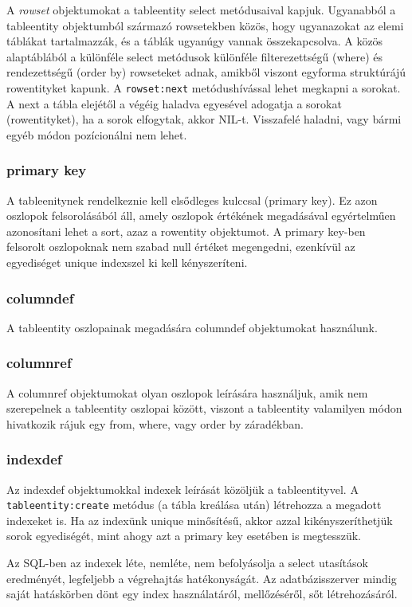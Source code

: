 A {\em rowset\/} objektumokat a tableentity select metódusaival kapjuk.
Ugyanabból a tableentity objektumból származó rowsetekben közös, 
hogy  ugyanazokat az elemi táblákat tartalmazzák,
és a táblák ugyanúgy vannak összekapcsolva.
A közös alaptáblából a különféle select metódusok különféle 
filterezettségű (where) és rendezettségű (order by) rowseteket adnak, 
amikből viszont egyforma struktúrájú rowentityket kapunk. 
A \verb!rowset:next! metódushívással lehet megkapni a sorokat. 
A next a tábla elejétől a végéig haladva egyesével
adogatja a sorokat (rowentityket), ha a sorok elfogytak, akkor NIL-t.
Visszafelé haladni, vagy bármi egyéb módon pozícionálni nem lehet.


\subsubsection*{primary key}

A tableenitynek rendelkeznie kell elsődleges kulccsal (primary key).
Ez azon oszlopok felsorolásából áll, amely oszlopok értékének
megadásával egyértelműen azonosítani lehet a sort, azaz a rowentity objektumot.
A primary key-ben felsorolt oszlopoknak nem szabad null értéket megengedni,
ezenkívül az egyediséget unique indexszel ki kell kényszeríteni.


\subsubsection*{columndef}

A tableentity oszlopainak megadására  columndef objektumokat használunk.

\subsubsection*{columnref}

A columnref objektumokat olyan oszlopok leírására használjuk,
amik nem szerepelnek a tableentity oszlopai között, viszont
a tableentity valamilyen módon hivatkozik rájuk egy from, where, 
vagy  order by záradékban.


\subsubsection*{indexdef}

Az indexdef objektumokkal indexek leírását közöljük a tableentityvel.
A \verb!tableentity:create! metódus (a tábla kreálása után) létrehozza 
a megadott indexeket is. Ha az indexünk unique minősítésű, akkor azzal 
kikényszeríthetjük sorok egyediségét, mint ahogy azt a primary key esetében 
is megtesszük.

Az SQL-ben az indexek léte, nemléte, nem befolyásolja a select 
utasítások eredményét, legfeljebb a végrehajtás hatékonyságát.
Az adatbázisszerver mindig saját hatáskörben dönt egy index használatáról,
mellőzéséről, sőt létrehozásáról. 




